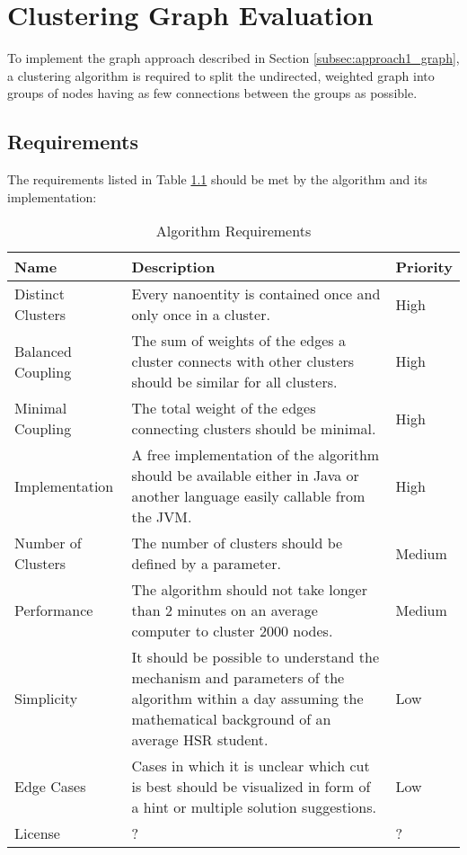 \chapter{Clustering Graph Evaluation}
\label{appendix:graphClustering}

To implement the graph approach described in Section \ref{subsec:approach1_graph}, a clustering algorithm is required to split the undirected, weighted graph into groups of nodes having as few connections between the groups as possible. 

\section{Requirements}

The requirements listed in Table \ref{tab:requirementsAlgorithm} should be met by the algorithm and its implementation:

\begin{table}[H]
	\centering
	\caption{Algorithm Requirements}
	\label{tab:requirementsAlgorithm}
	\begin{tabular}{|p{100pt}|p{250pt}|p{50pt}|}
		\hline	
		Name & Description & Priority \\
		\hline
		Distinct Clusters & Every nanoentity is contained once and only once in a cluster. & High  \\
		\hline
		Balanced Coupling & The sum of weights of the edges a cluster connects with other clusters should be similar for all clusters. & High \\ %
		\hline
		Minimal Coupling & The total weight of the edges connecting clusters should be minimal. & High \\
		\hline
		Implementation & A free implementation of the algorithm should be available either in Java or another language easily callable from the \gls{JVM}. & High  \\
		\hline
		Number of Clusters & The number of clusters should be defined by a parameter. & Medium \\
		\hline
		Performance & The algorithm should not take longer than 2 minutes on an average computer to cluster 2000 nodes.& Medium \\
		\hline
		Simplicity & It should be possible to understand the mechanism and parameters of the algorithm within a day assuming the mathematical background of an average \gls{HSR} student. & Low \\
		\hline
		Edge Cases & Cases in which it is unclear which cut is best should be visualized in form of a hint or multiple solution suggestions. & Low \\
		\hline
		License & ? & ? \\
		\hline
	\end{tabular}
\end{table}

